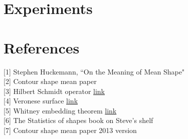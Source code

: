 \documentclass[12pt]{article}
\theoremstyle{definition}
\theoremstyle{remark}
\numberwithin{equation}{section}
\begin{document}
\section{Experiments}


\section{References}
[1] Stephen Huckemann, ``On the Meaning of Mean Shape" \\[0.2cm]
[2] Contour shape mean paper\\[0.2cm]
[3] Hilbert Schmidt operator \href{http://en.wikipedia.org/wiki/Hilbert\%E2\%80\%93Schmidt_operator}{link}\\[0.2cm]
[4] Veronese surface \href{http://en.wikipedia.org/wiki/Veronese_surface}{link}\\[0.2cm]
[5] Whitney embedding theorem \href{http://en.wikipedia.org/wiki/Whitney_embedding_theorem}{link}\\[0.2cm]
[6] The Statistics of shapes book on Steve's shelf\\[0.2cm]
[7] Contour shape mean paper 2013 version
\end{document}
